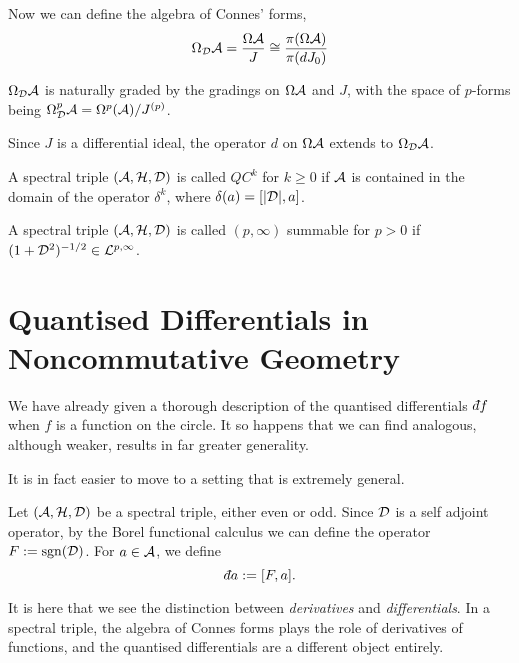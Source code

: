 Now we can define the algebra of Connes' forms,
\begin{equation*}
    \Omega_{\mathcal{D}}\mathcal{A} = \frac{\Omega \mathcal{A}}{J} \cong \frac{\pi(\Omega \mathcal{A})}{\pi(dJ_0)}
\end{equation*}

$\Omega_{\mathcal{D}} \mathcal{A}$ is naturally graded by the gradings on $\Omega \mathcal{A}$ and $J$, with the 
space of $p$-forms being $\Omega^p_{\mathcal{D}} \mathcal{A} = \Omega^p(\mathcal{A})/J^{(p)}$.

Since $J$ is a differential ideal, the operator $d$ on $\Omega \mathcal{A}$
extends to $\Omega_{\mathcal{D}} \mathcal{A}$.  


\begin{definition}
    A spectral triple $(\mathcal{A},\mathcal{H},\mathcal{D})$ is called $QC^k$ for $k \geq 0$
    if $\mathcal{A}$ is contained in the domain of the operator $\delta^k$, where $\delta(a) = [|\mathcal{D}|,a]$.
\end{definition}

\begin{definition}[Summability]
    A spectral triple $(\mathcal{A},\mathcal{H},\mathcal{D})$ is called $(p,\infty)$ summable
    for $p > 0$ if $(1+\mathcal{D}^2)^{-1/2} \in \mathcal{L}^{p,\infty}$.
\end{definition}

        
\section{Quantised Differentials in Noncommutative Geometry}
We have already given a thorough description of the quantised differentials $\qd f$
when $f$ is a function on the circle. It so happens that we can find
analogous, although weaker, results in far greater generality.

It is in fact easier to move to a setting that is extremely general.

\begin{definition}
    Let $(\mathcal{A},\mathcal{H},\mathcal{D})$ be a spectral triple, either even or odd. Since $\mathcal{D}$
    is a self adjoint operator, by the Borel functional calculus
    we can define the operator $F := \operatorname{sgn}(\mathcal{D})$. For $a \in \mathcal{A}$, we define
    \begin{equation}
        \qd a := [F,a].
    \end{equation}
\end{definition}

It is here that we see the distinction between \emph{derivatives}
and \emph{differentials}. In a spectral triple, the algebra
of Connes forms plays the role of derivatives of functions, and the quantised
differentials are a different object entirely.

